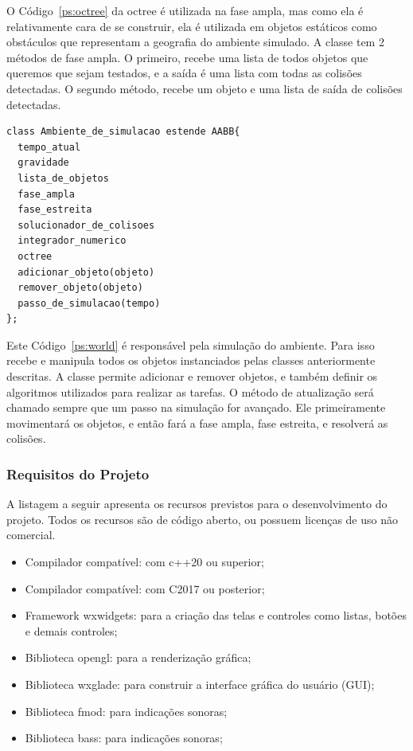 O Código~\ref{ps:octree} da octree é utilizada na fase ampla, mas como ela é relativamente cara de se construir, ela é utilizada em objetos estáticos como obstáculos que representam a geografia do ambiente simulado. A classe tem 2 métodos de fase ampla. O primeiro, recebe uma lista de todos objetos que queremos que sejam testados, e a saída é uma lista com todas as colisões detectadas. O segundo método, recebe um objeto e uma lista de saída de colisões detectadas.

\begin{lstlisting}[frame=single,caption=Modelagem prévia para ambiente de simulação\label{ps:world}]
class Ambiente_de_simulacao estende AABB{
  tempo_atual
  gravidade
  lista_de_objetos
  fase_ampla
  fase_estreita
  solucionador_de_colisoes
  integrador_numerico
  octree
  adicionar_objeto(objeto)
  remover_objeto(objeto)
  passo_de_simulacao(tempo)
};
\end{lstlisting}

Este Código~\ref{ps:world} é responsável pela simulação do ambiente. Para isso recebe e manipula todos os objetos instanciados pelas classes anteriormente descritas. A classe permite adicionar e remover objetos, e também definir os algoritmos utilizados para realizar as tarefas.
O método de atualização será chamado sempre que um passo na simulação for avançado. Ele primeiramente movimentará os objetos, e então fará a fase ampla, fase
estreita, e resolverá as colisões.

\subsubsection{Requisitos do Projeto}

A listagem a seguir apresenta os recursos previstos para o desenvolvimento do projeto. Todos os  recursos são  de código aberto, ou possuem licenças de uso não comercial.

\begin{itemize}
\item Compilador compatível: com c++20 ou superior;
\item Compilador compatível: com C2017 ou posterior;
\item Framework wxwidgets: para a criação das telas e controles como listas, botões e demais controles;
\item Biblioteca opengl: para a renderização gráfica;
\item Biblioteca wxglade: para construir a interface gráfica do usuário (GUI);
\item Biblioteca fmod: para indicações sonoras;
\item Biblioteca bass: para indicações sonoras;
\end{itemize}

